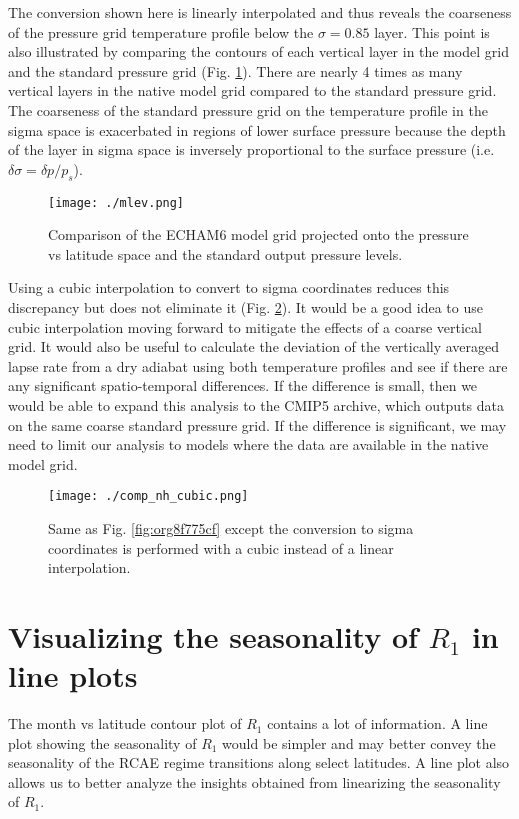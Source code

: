 \documentclass[11pt]{article}
\begin{document}
The conversion shown here is linearly interpolated and thus reveals the coarseness of the pressure grid temperature profile below the \(\sigma=0.85\) layer. This point is also illustrated by comparing the contours of each vertical layer in the model grid and the standard pressure grid (Fig. \ref{fig:org34e03d3}). There are nearly 4 times as many vertical layers in the native model grid compared to the standard pressure grid. The coarseness of the standard pressure grid on the temperature profile in the sigma space is exacerbated in regions of lower surface pressure because the depth of the layer in sigma space is inversely proportional to the surface pressure (i.e. \(\delta \sigma = \delta p / p_s\)).

\begin{figure}[htbp]
\centering
\texttt{[image: ./mlev.png]}
\caption{\label{fig:org34e03d3}Comparison of the ECHAM6 model grid projected onto the pressure vs latitude space and the standard output pressure levels.}
\end{figure}

Using a cubic interpolation to convert to sigma coordinates reduces this discrepancy but does not eliminate it (Fig. \ref{fig:orgc26e3a4}). It would be a good idea to use cubic interpolation moving forward to mitigate the effects of a coarse vertical grid. It would also be useful to calculate the deviation of the vertically averaged lapse rate from a dry adiabat using both temperature profiles and see if there are any significant spatio-temporal differences. If the difference is small, then we would be able to expand this analysis to the CMIP5 archive, which outputs data on the same coarse standard pressure grid. If the difference is significant, we may need to limit our analysis to models where the data are available in the native model grid.

\begin{figure}[htbp]
\centering
\texttt{[image: ./comp\_nh\_cubic.png]}
\caption{\label{fig:orgc26e3a4}Same as Fig. \ref{fig:org8f775cf} except the conversion to sigma coordinates is performed with a cubic instead of a linear interpolation.}
\end{figure}

\section{Visualizing the seasonality of \(R_1\) in line plots}
\label{sec:orgc290cfd}
The month vs latitude contour plot of \(R_1\) contains a lot of information. A line plot showing the seasonality of \(R_1\) would be simpler and may better convey the seasonality of the RCAE regime transitions along select latitudes. A line plot also allows us to better analyze the insights obtained from linearizing the seasonality of \(R_1\).
\end{document}
